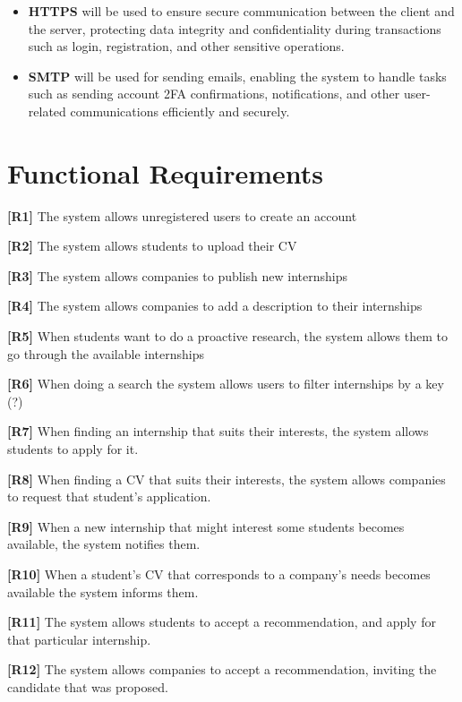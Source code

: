 \begin{itemize}
    \item \textbf{HTTPS} will be used to ensure secure communication between the client and the server, protecting data integrity and confidentiality during transactions such as login, registration, and other sensitive operations.
    
    \item \textbf{SMTP} will be used for sending emails, enabling the system to handle tasks such as sending account 2FA confirmations, notifications, and other user-related communications efficiently and securely.

\end{itemize}

\pagebreak
\section{Functional Requirements}

\textbf{[R1]} The system allows unregistered users to create an account

\textbf{[R2]} The system allows students to upload their CV

\textbf{[R3]} The system allows companies to publish new internships

\textbf{[R4]} The system allows companies to add a description to their internships

\textbf{[R5]} When students want to do a proactive research, the system allows them to go through the available internships

\textbf{[R6]} When doing a search the system allows users to filter internships by a key (?)

\textbf{[R7]} When finding an internship that suits their interests, the system allows students to apply for it. 

\textbf{[R8]} When finding a CV that suits their interests, the system allows companies to request that student's application.

\textbf{[R9]} When a new internship that might interest some students becomes available, the system notifies them.

\textbf{[R10]} When a student's CV that corresponds to a company's needs becomes available the system informs them. 

\textbf{[R11]} The system allows students to accept a recommendation, and apply for that particular internship. 

\textbf{[R12]} The system allows companies to accept a recommendation, inviting the candidate that was proposed.

